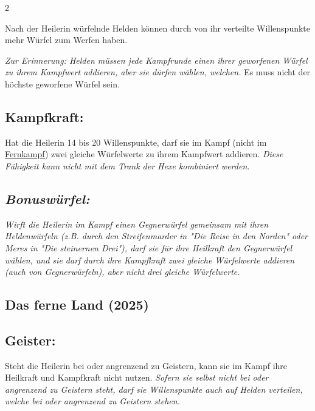 \documentclass[10pt, a4paper, oneside]{book}
\newcommand{\fan}[1]{\textit{#1}}
\begin{document}
\begin{multicols*}{2}
\begin{nobgcolor}
Nach der Heilerin würfelnde Helden können durch von ihr verteilte Willenspunkte mehr Würfel zum Werfen haben.
\supercite{dfl-begleitheft}

\fan{Zur Erinnerung: Helden müssen jede Kampfrunde einen ihrer geworfenen Würfel zu ihrem Kampfwert addieren, aber sie dürfen wählen, welchen.} Es muss nicht der höchste geworfene Würfel sein.
\supercite{127533}









\subsection{Kampfkraft:}

Hat die Heilerin 14 bis 20 Willenspunkte, darf sie im Kampf (nicht im \hyperref[fernkaempfer]{Fernkampf}\supercite{dfl-begleitheft}) zwei gleiche Würfelwerte zu ihrem Kampfwert addieren.
\fan{Diese Fähigkeit kann nicht mit dem Trank der Hexe kombiniert werden.}



\subsection{\fan{Bonuswürfel:}}

\fan{Wirft die Heilerin im Kampf einen Gegnerwürfel gemeinsam mit ihren Heldenwürfeln (z.B. durch den Streifenmarder in "Die Reise in den Norden" oder Meres in "Die steinernen Drei"), darf sie für ihre Heilkraft den Gegnerwürfel wählen, und sie darf durch ihre Kampfkraft zwei gleiche Würfelwerte addieren (auch von Gegnerwürfeln), aber nicht drei gleiche Würfelwerte.}



\end{nobgcolor}





\columnbreak

\begin{bgcolor}
\section{Das ferne Land (2025)}

\subsection{Geister:}

Steht die Heilerin bei oder angrenzend zu Geistern, kann sie im Kampf ihre Heilkraft und Kampfkraft nicht nutzen. \fan{Sofern sie selbst nicht bei oder angrenzend zu Geistern steht, darf sie Willenspunkte auch auf Helden verteilen, welche bei oder angrenzend zu Geistern stehen.}

\end{bgcolor}


\end{multicols*}
\end{document}
